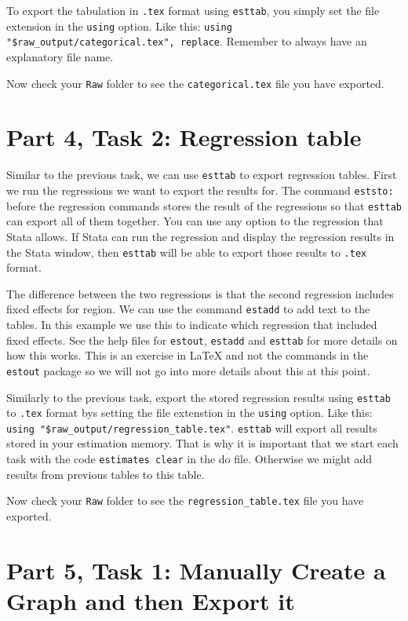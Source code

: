 \documentclass[]{article}
\begin{document}
To export the tabulation in \texttt{.tex} format using \texttt{esttab}, you simply set the file extension in the \texttt{using} option. Like this: \verb|using "$raw_output/categorical.tex", replace|. Remember to always have an explanatory file name.

Now check your \texttt{Raw} folder to see the \texttt{categorical.tex} file you have exported.

\section*{Part 4, Task 2: Regression table}

Similar to the previous task, we can use \texttt{esttab} to export regression tables. First we run the regressions we want to export the results for. The command \texttt{eststo:} before the regression commands stores the result of the regressions so that \texttt{esttab} can export all of them together. You can use any option to the regression that Stata allows. If Stata can run the regression and display the regression results in the Stata window, then \texttt{esttab} will be able to export those results to \texttt{.tex} format.

The difference between the two regressions is that the second regression includes fixed effects for region. We can use the command \texttt{estadd} to add text to the tables. In this example we use this to indicate which regression that included fixed effects. See the help files for \texttt{estout}, \texttt{estadd} and \texttt{esttab} for more details on how this works. This is an exercise in {\LaTeX} and not the commands in the \texttt{estout} package so we will not go into more details about this at this point. 

Similarly to the previous task, export the stored regression results using \texttt{esttab} to \texttt{.tex} format bys setting the file extenstion in the \texttt{using} option. Like this: \verb|using "$raw_output/regression_table.tex"|. \texttt{esttab} will export all results stored in your estimation memory. That is why it is important that we start each task with the code \texttt{estimates 	clear} in the do file. Otherwise we might add results from previous tables to this table.

Now check your \texttt{Raw} folder to see the \texttt{regression\_table.tex} file you have exported.

\section*{Part 5, Task 1: Manually Create a Graph and then Export it}
\end{document}
